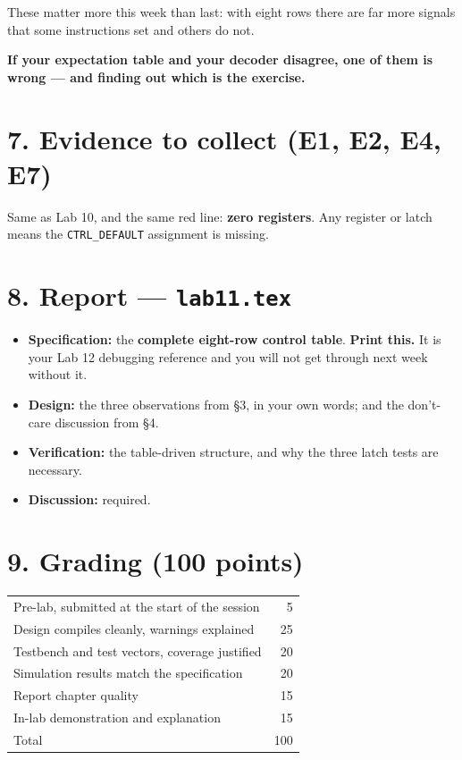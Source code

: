 \documentclass[11pt]{article}
\newcommand{\code}[1]{\texttt{#1}}
\begin{document}
These matter more this week than last: with eight rows there are far more
signals that some instructions set and others do not.

\textbf{If your expectation table and your decoder disagree, one of them is
wrong --- and finding out which is the exercise.}

\section*{7. Evidence to collect (E1, E2, E4, E7)}

Same as Lab 10, and the same red line: \textbf{zero registers}. Any register or
latch means the \code{CTRL\_DEFAULT} assignment is missing.

\section*{8. Report --- \code{lab11.tex}}

\begin{itemize}[leftmargin=1.6em,itemsep=1pt]
\item \textbf{Specification:} the \textbf{complete eight-row control table}.
\textbf{Print this.} It is your Lab 12 debugging reference and you will not get
through next week without it.
\item \textbf{Design:} the three observations from \S3, in your own words; and
the don't-care discussion from \S4.
\item \textbf{Verification:} the table-driven structure, and why the three latch
tests are necessary.
\item \textbf{Discussion:} required.
\end{itemize}

\section*{9. Grading (100 points)}

\begin{center}
\begin{tabular}{lr}
\toprule
Pre-lab, submitted at the start of the session & 5 \\
Design compiles cleanly, warnings explained & 25 \\
Testbench and test vectors, coverage justified & 20 \\
Simulation results match the specification & 20 \\
Report chapter quality & 15 \\
In-lab demonstration and explanation & 15 \\
\midrule
Total & 100 \\
\bottomrule
\end{tabular}
\end{center}
\end{document}
